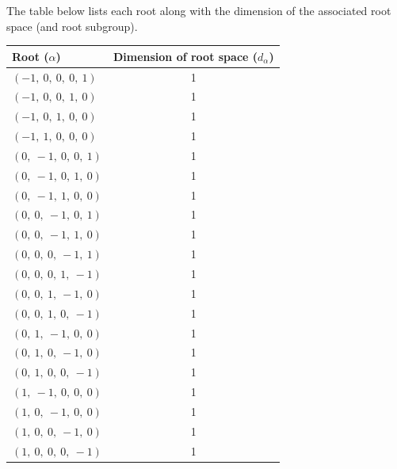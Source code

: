 \documentclass[11pt]{article}
\theoremstyle{definition}
\begin{document}
The table below lists each root along with the dimension of the associated root space (and root subgroup).

\bigskip

\noindent \begin{tabular}{|l|c|}
    \hline
    \textbf{Root ($\alpha$)} & \textbf{Dimension of root space ($d_{\alpha}$)} \\
    \hline
    $\left( -1, \  0, \  0, \  0, \  1\right)$ & 1 \\
    \hline
    $\left( -1, \  0, \  0, \  1, \  0\right)$ & 1 \\
    \hline
    $\left( -1, \  0, \  1, \  0, \  0\right)$ & 1 \\
    \hline
    $\left( -1, \  1, \  0, \  0, \  0\right)$ & 1 \\
    \hline
    $\left( 0, \  -1, \  0, \  0, \  1\right)$ & 1 \\
    \hline
    $\left( 0, \  -1, \  0, \  1, \  0\right)$ & 1 \\
    \hline
    $\left( 0, \  -1, \  1, \  0, \  0\right)$ & 1 \\
    \hline
    $\left( 0, \  0, \  -1, \  0, \  1\right)$ & 1 \\
    \hline
    $\left( 0, \  0, \  -1, \  1, \  0\right)$ & 1 \\
    \hline
    $\left( 0, \  0, \  0, \  -1, \  1\right)$ & 1 \\
    \hline
    $\left( 0, \  0, \  0, \  1, \  -1\right)$ & 1 \\
    \hline
    $\left( 0, \  0, \  1, \  -1, \  0\right)$ & 1 \\
    \hline
    $\left( 0, \  0, \  1, \  0, \  -1\right)$ & 1 \\
    \hline
    $\left( 0, \  1, \  -1, \  0, \  0\right)$ & 1 \\
    \hline
    $\left( 0, \  1, \  0, \  -1, \  0\right)$ & 1 \\
    \hline
    $\left( 0, \  1, \  0, \  0, \  -1\right)$ & 1 \\
    \hline
    $\left( 1, \  -1, \  0, \  0, \  0\right)$ & 1 \\
    \hline
    $\left( 1, \  0, \  -1, \  0, \  0\right)$ & 1 \\
    \hline
    $\left( 1, \  0, \  0, \  -1, \  0\right)$ & 1 \\
    \hline
    $\left( 1, \  0, \  0, \  0, \  -1\right)$ & 1 \\
    \hline
\end{tabular}
\end{document}
